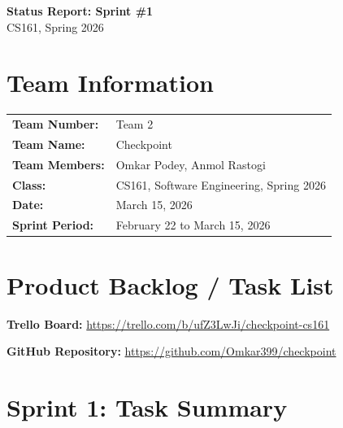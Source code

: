 \documentclass[11pt]{article}
\begin{document}
\begin{center}
    {\LARGE \textbf{Status Report: Sprint \#1}} \\[6pt]
    {\large CS161, Spring 2026}
\end{center}

\vspace{0.5em}

\section{Team Information}

\begin{tabularx}{\textwidth}{@{}lX@{}}
    \textbf{Team Number:}          & Team 2 \\
    \textbf{Team Name:}            & Checkpoint \\
    \textbf{Team Members:}         & Omkar Podey, Anmol Rastogi \\
    \textbf{Class:}                & CS161, Software Engineering, Spring 2026 \\
    \textbf{Date:}                 & March 15, 2026 \\
    \textbf{Sprint Period:}        & February 22 to March 15, 2026 \\
\end{tabularx}

\section{Product Backlog / Task List}

\textbf{Trello Board:} \url{https://trello.com/b/ufZ3LwJi/checkpoint-cs161}

\textbf{GitHub Repository:} \url{https://github.com/Omkar399/checkpoint}

\section{Sprint 1: Task Summary}
\end{document}
